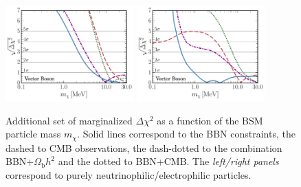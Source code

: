 \documentclass[notitlepage,letterpaper,natbib,aps,prd,onecolumn,amsmath,amsfonts,nofootinbib,preprintnumbers,superscriptaddress,secnumarabic,groupedaddress]{revtex4-1}
\begin{document}
\begin{figure}[t]
    \includegraphics[width=0.44\textwidth]{figures/Nu_Zp_sqrtchisq.pdf} \quad \includegraphics[width=0.44\textwidth]{figures/EE_Zp_sqrtchisq.pdf}\vspace{-0.3cm}
    \caption{Additional set of marginalized $\Delta \chi^2$ as a function of the BSM particle mass $m_\chi$. Solid lines correspond to the BBN constraints, the dashed to CMB observations, the dash-dotted to the combination BBN+$\Omega_{\mathrm{b}}h^2$ and the dotted to BBN+CMB. The \textit{left/right panels} correspond to purely neutrinophilic/electrophilic particles.}
    \label{fig:Multiplot}
\end{figure}
\end{document}
